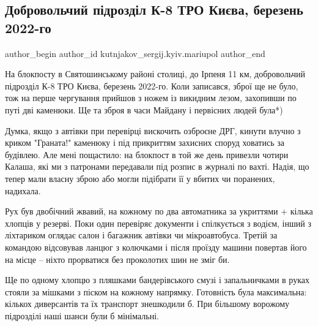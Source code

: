  
 
 
 
 

\subsection{Добровольчий підрозділ К-8 ТРО Києва, березень 2022-го}
\label{sec:22_03_2023.fb.kutnjakov_sergij.kyiv.mariupol.1.dobrovolchii_p_drozd}

\ifcmt
 author_begin
   author_id kutnjakov_sergij.kyiv.mariupol
 author_end
\fi

На блокпосту в Святошинському районі столиці, до Ірпеня 11 км, добровольчий
підрозділ К-8 ТРО Києва, березень 2022-го. Коли записався, зброї ще не було,
тож на перше чергування прийшов з ножем із викидним лезом, захопивши по путі
дві каменюки. Ще та зброя в часи Майдану і первісних людей була*)

Думка, якщо з автівки при перевірці вискочить озброєне ДРГ, кинути влучно з
криком "Граната!" каменюку і під прикриттям захисних споруд ховатись за
будівлею. Але мені пощастило: на блокпост в той же день привезли чотири Калаша,
які ми з патронами передавали під розпис в журналі по вахті. Надія, що тепер
мали власну зброю або могли підібрати її у вбитих чи поранених, надихала.


Рух був двобічний жвавий, на кожному по два автоматника за укриттями + кілька
хлопців у резерві. Поки один перевіряє документи і спілкується з водієм, інший
з ліхтариком оглядає салон і багажник автівки чи мікроавтобуса. Третій за
командою відсовував ланцюг з колючками і після проїзду машини повертав його на
місце – ніхто прорватися без проколотих шин не зміг би.

Ще по одному хлопцю з пляшками бандерівського смузі і запальничками в руках
стояли за мішками з піском на кожному напрямку. Готовність була максимальна:
кількох диверсантів та їх транспорт знешкодили б. При більшому ворожому
підрозділі наші шанси були б мінімальні.

